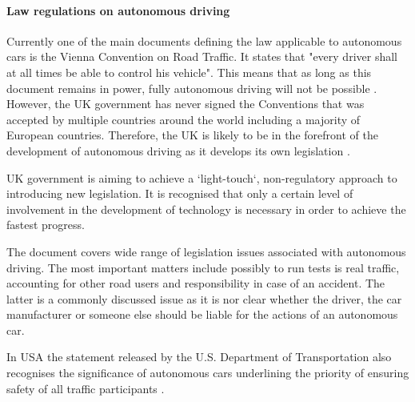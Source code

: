 \documentclass[11pt,english]{article}
\begin{document}
\paragraph{Law regulations on autonomous driving}

\par
Currently one of the main documents defining the law applicable to autonomous cars is the Vienna Convention on Road Traffic. It states that "every driver shall at all times be able to control his vehicle". This means that as long as this document remains in power, fully autonomous driving will not be possible \citep{vienna1}. However, the UK government has never signed the Conventions that was accepted by multiple countries around the world including a majority of European countries. Therefore, the UK is likely to be in the forefront of the development of autonomous driving as it develops its own legislation \citep{telegraph}.

\par


UK government is aiming to achieve a `light-touch`, non-regulatory approach to introducing new legislation. It is recognised that only a certain level of involvement in the development of technology is necessary in order to achieve the fastest progress.
\par


\par
The \citet{pathwaytodriverless2} document covers wide range of legislation issues associated with autonomous driving. The most important matters include possibly to run tests is real traffic, accounting for other road users and  responsibility in case of an accident. The latter is a commonly discussed issue as it is nor clear whether the driver, the car manufacturer or someone else should be liable for the actions of an autonomous car. 

\par
In USA the statement released by the U.S. Department of Transportation also recognises the significance of autonomous cars underlining the priority of ensuring safety of all traffic participants \citep{nhtsa1}.
\par



\end{document}
